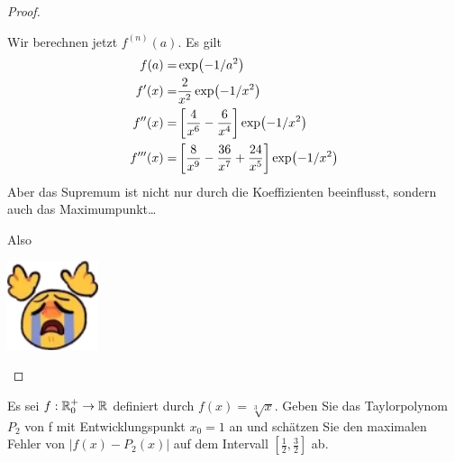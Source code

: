 \begin{proof}
\begin{parts}
	Wir berechnen jetzt $f^{(n)}(a)$. Es gilt
	\begin{align*}
		f(a)=&\exp(-1 / a^2)\\
		f'(x)=&\frac{2}{x^2}\exp(-1 / x^2)\\
		f''(x)=&\left[ \frac{4}{x^6}-\frac{6}{x^4} \right]\exp(-1 / x^2)\\
		f'''(x)=&\left[ \frac{8}{x^9}-\frac{36}{x^7}+\frac{24}{x^5} \right]\exp(-1 / x^2) \qedhere
	\end{align*}
	Aber das Supremum ist nicht nur durch die Koeffizienten beeinflusst, sondern auch das Maximumpunkt\ldots
	\begin{center}
	\end{center}
	Also
	\begin{center}
		\includegraphics[width=0.2\textwidth]{gg.png}
	\end{center}
	\end{parts}
\end{proof}
\begin{Problem}
	Es sei $f : \mathbb{R}_0^+ \to \mathbb{R}$ definiert durch $f (x) = \sqrt[3]{x}$. Geben Sie das Taylorpolynom $P_2$ von f mit Entwicklungspunkt $x_0 = 1$ an und schätzen Sie den maximalen Fehler von $|f(x) - P_2(x)|$ auf dem Intervall $\left[ \frac{1}{2},\frac{3}{2} \right] $ ab.
\end{Problem}
